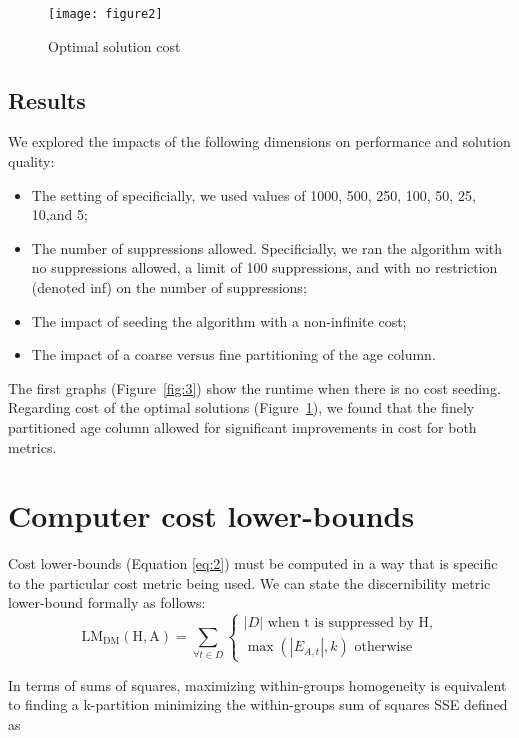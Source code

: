 \documentclass[]{seismica}
\begin{document}
   \begin{figure}[ht!]
       \texttt{[image: figure2]}
       \caption{Optimal solution cost}
       \label{fig:4}
   \end{figure}

	\subsection{Results}
	We explored the impacts of the following dimensions on performance and solution quality:

    \begin{itemize}
        \item The setting of specificially, we used values of 1000, 500, 250, 100, 50, 25, 10,and 5;
        \item The number of suppressions allowed. Specificially, we ran the algorithm with no suppressions allowed, a limit of 100 suppressions, and with no restriction (denoted inf) on the number of suppressions;
        \item The impact of seeding the algorithm with a non-infinite cost;
        \item The impact of a coarse versus fine partitioning of the age column.
    \end{itemize}

    The first graphs (Figure~\ref{fig:3}) show the runtime when there is no cost seeding. Regarding cost of the optimal solutions (Figure~\ref{fig:4}), we found that the finely partitioned age column allowed for significant improvements in cost for both metrics.

    \section{Computer cost lower-bounds}
    Cost lower-bounds (Equation \ref{eq:2}) must be computed in a way that is specific to the particular cost metric being used. We can state the discernibility metric lower-bound formally as follows:
    \begin{equation} \label{eq:2}
    \mathrm{LM_{DM}(H,A)} = \sum_{\forall t \in D}
    \begin{cases}
        \left | D \right | \text{ when t is suppressed by H,}\\
        \max(\left | E_{A,t} \right |, k) \text{ otherwise}
    \end{cases}
    \end{equation}

    In terms of sums of squares, maximizing within-groups homogeneity is equivalent to finding a k-partition minimizing the within-groups sum of squares SSE defined as
\end{document}
